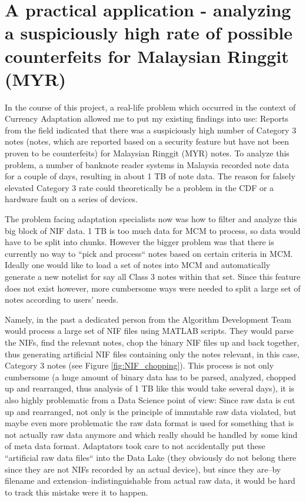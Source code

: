 \section{A practical application - analyzing a suspiciously high rate of possible counterfeits for Malaysian Ringgit (MYR)}
In the course of this project, a real-life problem which occurred in the context of Currency Adaptation allowed me to put my existing findings into use: 
Reports from the field indicated that there was a suspiciously high number of Category 3 notes (notes, which are reported based on a security feature but have not been proven to be counterfeits) for Malaysian Ringgit (MYR) notes. To analyze this problem, a number of banknote reader systems in Malaysia recorded note data for a couple of days, resulting in about 1 TB of note data. 
The reason for falsely elevated Category 3 rate could theoretically be a problem in the CDF or a hardware fault on a series of devices. \par
The problem facing adaptation specialists now was how to filter and analyze this big block of NIF data. 1 TB is too much data for MCM to process, so data would have to be split into chunks. However the bigger problem was that there is currently no way to ``pick and process`` notes based on certain criteria in MCM. Ideally one would like to load a set of notes into MCM and automatically generate a new notelist for say all Class 3 notes within that set. Since this feature does not exist however, more cumbersome ways were needed to split a large set of notes according to users' needs. \par 
Namely, in the past a dedicated person from the Algorithm Development Team would process a large set of NIF files using MATLAB scripts. They would parse the NIFs, find the relevant notes, chop the binary NIF files up and back together, thus generating artificial NIF files containing only the notes relevant, in this case, Category 3 notes (see Figure \ref{fig:NIF_chopping}). This process is not only cumbersome (a huge amount of binary data has to be parsed, analyzed, chopped up and rearranged, thus analysis of 1 TB like this would take several days), it is also highly problematic from a Data Science point of view: Since raw data is cut up and rearranged, not only is the principle of immutable raw data violated, but maybe even more problematic the raw data format is used for something that is not actually raw data anymore and which really should be handled by some kind of meta data format. Adaptators took care to not accidentally put these ``artificial raw data files`` into the Data Lake (they obviously do not belong there since they are not NIFs recorded by an actual device), but since they are--by filename and extension--indistinguishable from actual raw data, it would be hard to track this mistake were it to happen. \par

